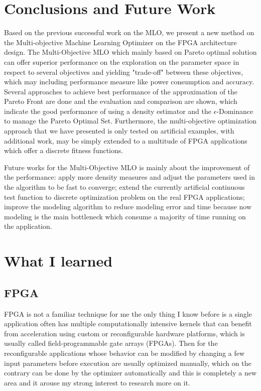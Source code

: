 \documentclass[11pt, runningheads,a4paper]{llncs}
\begin{document}
\section{Conclusions and Future Work}
Based on the previous successful work on the MLO, we present a new method on the Multi-objective Machine Learning Optimizer on the FPGA architecture design. The Multi-Objective MLO which mainly based on Pareto optimal solution can offer superior performance on the exploration on the parameter space in respect to several objectives and yielding "trade-off" between these objectives, which may including performance measure like power consumption and accuracy. Several approaches to achieve best performance of the approximation of the Pareto Front are done and the evaluation and comparison are shown, which indicate the good performance of using a density estimator and the $\epsilon$-Dominance to manage the Pareto Optimal Set. Furthermore, the multi-objective optimization approach that we have presented is only tested on artificial examples, with additional work, may be simply extended to a multitude of FPGA applications which offer a discrete fitness functions.

Future works for the Multi-Objective MLO is mainly about the improvement of the performance: apply more density measures and adjust the parameters used in the algorithm to be fast to converge; extend the currently artificial continuous test function to discrete optimization problem on the real FPGA applications; improve the modeling algorithm to reduce modeling error and time because now modeling is the main bottleneck which consume a majority of time running on the application. 

\section{What I learned}

\subsection{FPGA}
FPGA is not a familiar technique for me the only thing I know before is a single application often has multiple computationally intensive kernels that can benefit from acceleration using custom or reconfigurable hardware platforms, which is usually called field-programmable gate arrays (FPGAs). Then for the reconfigurable applications whose behavior can be modified by changing a few input parameters before execution are usually optimized manually, which on the contrary can be done by the optimizer automatically and this is completely a new area and it arouse my strong interest to research more on it.
\end{document}

